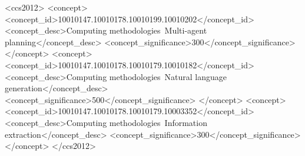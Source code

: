 \documentclass[sigconf]{acmart}
\begin{document}
\begin{CCSXML}
<ccs2012>
   <concept>
       <concept_id>10010147.10010178.10010199.10010202</concept_id>
       <concept_desc>Computing methodologies~Multi-agent planning</concept_desc>
       <concept_significance>300</concept_significance>
       </concept>
   <concept>
       <concept_id>10010147.10010178.10010179.10010182</concept_id>
       <concept_desc>Computing methodologies~Natural language generation</concept_desc>
       <concept_significance>500</concept_significance>
       </concept>
   <concept>
       <concept_id>10010147.10010178.10010179.10003352</concept_id>
       <concept_desc>Computing methodologies~Information extraction</concept_desc>
       <concept_significance>300</concept_significance>
       </concept>
 </ccs2012>
\end{CCSXML}


\maketitle

\end{document}
